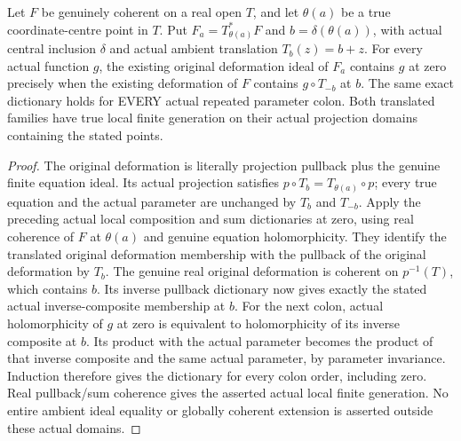 \begin{lemma}
\label{hir:real-domain-actual-point-deformation-and-all-colon-translation}
\leanok
Let $F$ be genuinely coherent on a real open $T$, and let $\theta(a)$ be a
true coordinate-centre point in $T$. Put $F_a=T_{\theta(a)}^*F$ and
$b=\delta(\theta(a))$, with actual central inclusion $\delta$ and actual
ambient translation $T_b(z)=b+z$. For every actual function $g$, the existing
original deformation ideal of $F_a$ contains $g$ at zero precisely when the
existing deformation of $F$ contains $g\circ T_{-b}$ at $b$.
The same exact dictionary holds for EVERY actual repeated parameter colon.
Both translated families have true local finite generation on their actual
projection domains containing the stated points.
\end{lemma}
\begin{proof}
The original deformation is literally projection pullback plus the genuine
finite equation ideal. Its actual projection satisfies
$p\circ T_b=T_{\theta(a)}\circ p$; every true equation and the actual parameter
are unchanged by $T_b$ and $T_{-b}$. Apply the preceding actual local
composition and sum dictionaries at zero, using real coherence of $F$ at
$\theta(a)$ and genuine equation holomorphicity. They identify the translated
original deformation membership with the pullback of the original deformation
by $T_b$. The genuine real original deformation is coherent on $p^{-1}(T)$,
which contains $b$. Its inverse pullback dictionary now gives exactly the
stated actual inverse-composite membership at $b$. For the next colon,
actual holomorphicity of $g$ at zero is equivalent to holomorphicity of its
inverse composite at $b$. Its product with the actual parameter becomes the
product of that inverse composite and the same actual parameter, by parameter
invariance. Induction therefore gives the dictionary for every colon order,
including zero. Real pullback/sum coherence gives the asserted actual local
finite generation. No entire ambient ideal equality or globally coherent
extension is asserted outside these actual domains.
\end{proof}

